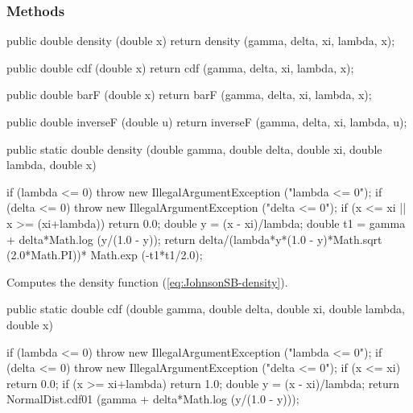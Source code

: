 \subsubsection* {Methods}
\begin{hide}
\begin{code}

   public double density (double x) {
      return density (gamma, delta, xi, lambda, x);
   }
       
   public double cdf (double x) {
      return cdf (gamma, delta, xi, lambda, x);
   }
     
   public double barF (double x) {
      return barF (gamma, delta, xi, lambda, x);
   }

   public double inverseF (double u){
      return inverseF (gamma, delta, xi, lambda, u);
   }
\end{code}
\end{hide}\begin{code}

   public static double density (double gamma, double delta,
                                 double xi, double lambda, double x)\begin{hide} {
      if (lambda <= 0)
         throw new IllegalArgumentException ("lambda <= 0");
      if (delta <= 0)
         throw new IllegalArgumentException ("delta <= 0");
      if (x <= xi || x >= (xi+lambda))
         return 0.0;
      double y = (x - xi)/lambda;
      double t1 = gamma + delta*Math.log (y/(1.0 - y));
      return delta/(lambda*y*(1.0 - y)*Math.sqrt (2.0*Math.PI))*
           Math.exp (-t1*t1/2.0);
   }\end{hide}
\end{code}
\begin{tabb} Computes the density function (\ref{eq:JohnsonSB-density}).
\end{tabb}
\begin{code}      

   public static double cdf (double gamma, double delta,
                             double xi, double lambda, double x)\begin{hide} {
      if (lambda <= 0)
         throw new IllegalArgumentException ("lambda <= 0");
      if (delta <= 0)
         throw new IllegalArgumentException ("delta <= 0");
      if (x <= xi)
         return 0.0;
      if (x >= xi+lambda)
         return 1.0;
      double y = (x - xi)/lambda;
      return NormalDist.cdf01 (gamma + delta*Math.log (y/(1.0 - y)));
   }\end{hide}
\end{code}
